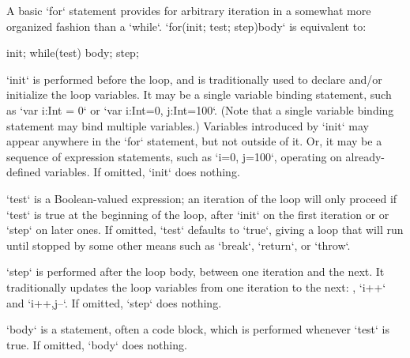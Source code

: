 A basic \xcd`for` statement provides for arbitrary iteration in a somewhat
more organized fashion than a \xcd`while`.  \xcd`for(init; test; step)body` is
equivalent to: 
\begin{xten}
{
   init;
   while(test) {
      body;
      step;
   }
}
\end{xten}

\xcd`init` is performed before the loop, and is traditionally used to declare
and/or initialize the loop variables. It may be a single variable binding
statement, such as \xcd`var i:Int = 0` or \xcd`var i:Int=0, j:Int=100`. (Note
that a single variable binding statement may bind multiple variables.)
Variables introduced by \xcd`init` may appear anywhere in the \xcd`for`
statement, but not outside of it.  Or, it may be a sequence of expression
statements, such as \xcd`i=0, j=100`, operating on already-defined variables.
If omitted, \xcd`init` does nothing.

\xcd`test` is a Boolean-valued expression; an iteration of the loop will only
proceed if \xcd`test` is true at the beginning of the loop, after \xcd`init`
on the first iteration or or \xcd`step` on later ones. If omitted, \xcd`test`
defaults to \xcd`true`, giving a loop that will run until stopped by some
other means such as \xcd`break`, \xcd`return`, or \xcd`throw`.

\xcd`step` is performed after the loop body, between one iteration and the
next. It traditionally updates the loop variables from one iteration to the
next: \eg, \xcd`i++` and \xcd`i++,j--`.  If omitted, \xcd`step` does nothing.

\xcd`body` is a statement, often a code block, which is performed whenever
\xcd`test` is true.  If omitted, \xcd`body` does nothing.




